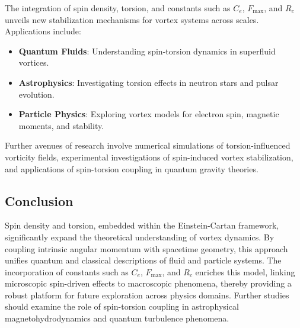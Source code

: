 The integration of spin density, torsion, and constants such as $C_e$, $F_{\max}$, and $R_c$ unveils new stabilization mechanisms for vortex systems across scales. Applications include:


\begin{itemize}

\item \textbf{Quantum Fluids}: Understanding spin-torsion dynamics in superfluid vortices.

\item \textbf{Astrophysics}: Investigating torsion effects in neutron stars and pulsar evolution.

\item \textbf{Particle Physics}: Exploring vortex models for electron spin, magnetic moments, and stability.

\end{itemize}

Further avenues of research involve numerical simulations of torsion-influenced vorticity fields, experimental investigations of spin-induced vortex stabilization, and applications of spin-torsion coupling in quantum gravity theories.


\subsection*{Conclusion}


Spin density and torsion, embedded within the Einstein-Cartan framework, significantly expand the theoretical understanding of vortex dynamics. By coupling intrinsic angular momentum with spacetime geometry, this approach unifies quantum and classical descriptions of fluid and particle systems. The incorporation of constants such as $C_e$, $F_{\max}$, and $R_c$ enriches this model, linking microscopic spin-driven effects to macroscopic phenomena, thereby providing a robust platform for future exploration across physics domains. Further studies should examine the role of spin-torsion coupling in astrophysical magnetohydrodynamics and quantum turbulence phenomena.